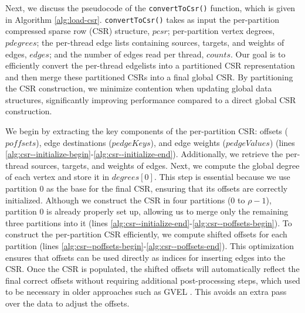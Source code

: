 

Next, we discuss the pseudocode of the \texttt{convertToCsr()} function, which is given in Algorithm \ref{alg:load-csr}. \texttt{convertToCsr()} takes as input the per-partition compressed sparse row (CSR) structure, $pcsr$; per-partition vertex degrees, $pdegrees$; the per-thread edge lists containing sources, targets, and weights of edges, $edges$; and the number of edges read per thread, $counts$. Our goal is to efficiently convert the per-thread edgelists into a partitioned CSR representation and then merge these partitioned CSRs into a final global CSR. By partitioning the CSR construction, we minimize contention when updating global data structures, significantly improving performance compared to a direct global CSR construction.

We begin by extracting the key components of the per-partition CSR: offsets ($poffsets$), edge destinations ($pedgeKeys$), and edge weights ($pedgeValues$) (lines \ref{alg:csr--initialize-begin}-\ref{alg:csr--initialize-end}). Additionally, we retrieve the per-thread sources, targets, and weights of edges. Next, we compute the global degree of each vertex and store it in $degrees[0]$. This step is essential because we use partition $0$ as the base for the final CSR, ensuring that its offsets are correctly initialized. Although we construct the CSR in four partitions ($0$ to $\rho-1$), partition $0$ is already properly set up, allowing us to merge only the remaining three partitions into it (lines \ref{alg:csr--initialize-end}-\ref{alg:csr--poffsets-begin}).
%
To construct the per-partition CSR efficiently, we compute shifted offsets for each partition (lines \ref{alg:csr--poffsets-begin}-\ref{alg:csr--poffsets-end}). This optimization ensures that offsets can be used directly as indices for inserting edges into the CSR. Once the CSR is populated, the shifted offsets will automatically reflect the final correct offsets without requiring additional post-processing steps, which used to be necessary in older approaches such as GVEL \cite{sahu2023gvel}. This avoids an extra pass over the data to adjust the offsets.

